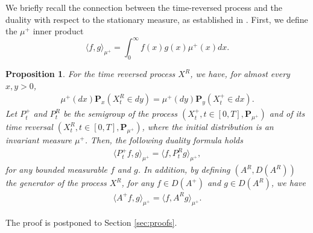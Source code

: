 \documentclass[11pt,a4paper]{article}
\newtheorem{proposition}[theorem]{Proposition}
\theoremstyle{definition}
\theoremstyle{remark}
\begin{document}
We briefly recall the connection between the time-reversed process and the duality with respect to the stationary measure, as established in \cite{nagasawa-quantum,nelson}. First, we define the \(\mu^+\) inner product
\[\langle f , g \rangle_{\mu^+}=\int_0^\infty f(x) g(x) \mu^+(x) dx. \]
\begin{proposition}
	\label{prop:stationary}
	For the time reversed process \(X^R\), we have, for almost every \(x,y>0\),
	\begin{align}
		\label{duality-density}
		\mu^+(dx) \mathbf{P}_x(X^R_t \in dy)= \mu^+(dy) \mathbf{P}_y(X^+_t \in dx).
	\end{align}
	Let \(P^+_t\) and \(P^R_t\) be the semigroup of the process \((X^+_t, t \in [0,T], \mathbf{P}_{\mu^+})\) and of its time reversal \((X^R_t , t \in [0,T], \mathbf{P}_{\mu^+})\), where
	the initial distribution is an invariant measure \(\mu^+\). Then, the following duality formula holds 
	\begin{align}
		\label{duality-semigrups}
		\langle P^+_t f , g \rangle_{\mu^+}= \langle  f , P^R_t g \rangle_{\mu^+},
	\end{align}
	for any bounded measurable \(f\) and \(g\). In addition, by defining \((A^R, {D}(A^R))\) the generator of the process \(X^R\), for any \(f \in {D}(A^+)\) and \(g \in {D}(A^R)\), we have
	\begin{align}
		\label{duality-generator}
		\langle A^+ f , g \rangle_{\mu^+}= \langle  f , A^R g \rangle_{\mu^+}.
	\end{align}
\end{proposition}
\noindent
The proof is postponed to Section \ref{sec:proofs}.
\end{document}
